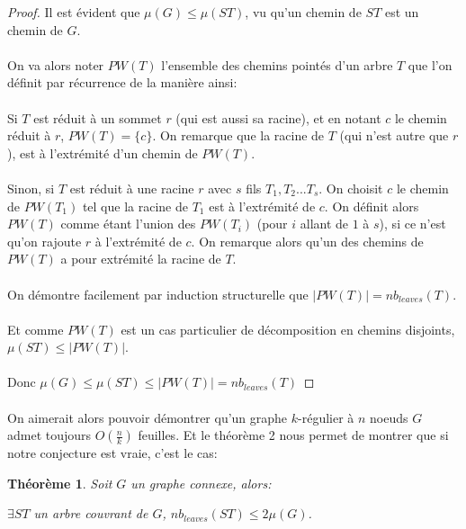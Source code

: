 \documentclass[a4paper]{article}
\newtheorem{theorem}{Théorème}
\theoremstyle{definition}
\theoremstyle{remark}
\begin{document}
\begin{proof}
Il est évident que $\mu(G) \leq \mu(ST)$, vu qu'un chemin de $ST$ est un
chemin de $G$.

\paragraph{}
On va alors noter $PW(T)$ l'ensemble des chemins pointés d'un arbre $T$ que l'on définit par récurrence de la manière ainsi:

\paragraph{}
Si $T$ est réduit à un sommet $r$ (qui est aussi sa racine), et en notant $c$ le chemin réduit à $r$, $PW(T) = \{c\}$. On remarque que la racine de $T$ (qui n'est autre que $r$), est à l'extrémité d'un chemin de $PW(T)$.

\paragraph{}
Sinon, si $T$ est réduit à une racine $r$ avec $s$ fils $T_{1}, T_{2} ... T_{s}$. On choisit $c$ le chemin de $PW(T_{1})$ tel que la racine de $T_{1}$ est à l'extrémité de $c$. On définit alors $PW(T)$ comme étant l'union des $PW(T_{i})$ (pour $i$ allant de $1$ à $s$), si ce n'est qu'on rajoute $r$ à l'extrémité de $c$. On remarque alors qu'un des chemins de $PW(T)$ a pour extrémité la racine de $T$.

\paragraph{}
On démontre facilement par induction structurelle que $|PW(T)|= nb_{leaves}(T)$.


\paragraph{}
Et comme $PW(T)$ est un cas particulier de décomposition en chemins disjoints, $\mu(ST) \leq |PW(T)|$.


\paragraph{}
Donc $\mu(G) \leq \mu(ST) \leq |PW(T)| = nb_{leaves}(T)$
\end{proof}


\paragraph{}
On aimerait alors pouvoir démontrer qu'un graphe $k$-régulier à $n$ noeuds $G$ admet toujours $O(\frac{n}{k})$ feuilles. Et le théorème 2 nous
permet de montrer que si notre conjecture est vraie, c'est le cas:
\begin{theorem}
Soit $G$ un graphe connexe, alors:

$\exists ST$ un arbre couvrant de $G$, $nb_{leaves}(ST)\leq 2\mu(G)$.
\end{theorem}
\end{document}
